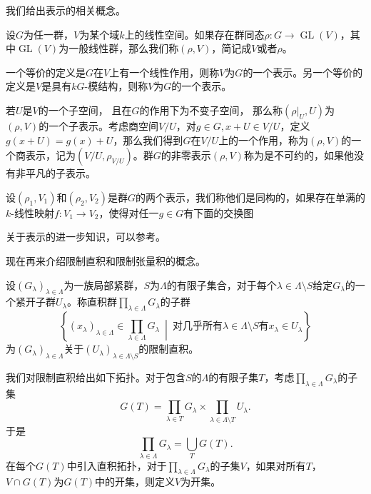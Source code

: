 我们给出表示的相关概念。

\begin{definition}
设$G$为任一群，$V$为某个域$k$上的线性空间。如果存在群同态$\rho: G \rightarrow \operatorname{GL}(V)$，其中$\operatorname{GL}(V)$为一般线性群，那么我们称$(\rho, V)$，简记成$V$或者$\rho$。
\end{definition}
一个等价的定义是$G$在$V$上有一个线性作用，则称$V$为$G$的一个表示。另一个等价的定义是$V$是具有$kG$-模结构，则称$V$为$G$的一个表示。

若$U$是$V$的一个子空间， 且在$G$的作用下为不变子空间， 那么称$(\rho|_U,U)$为$(\rho, V)$的一个子表示。考虑商空间$V/U$，对$g \in G, x + U \in V/U$，定义$g(x + U) = g(x) + U$，那么我们得到$G$在$V/U$上的一个作用，称为$(\rho, V)$的一个商表示，记为$(V/U, \rho_{V/U})$。群$G$的非零表示$(\rho, V)$称为是不可约的，如果他没有非平凡的子表示。

设$(\rho_1, V_1)$和$(\rho_2, V_2)$是群$G$的两个表示，我们称他们是同构的，如果存在单满的$k$-线性映射$f: V_1 \rightarrow V_2$，使得对任一$g \in G$有下面的交换图
\begin{center}
\end{center}

关于表示的进一步知识，可以参考。

现在再来介绍限制直积\cite{nt1}和限制张量积\cite{bump1998automorphic}的概念。

\begin{definition}
设$(G_\lambda)_{\lambda\in\Lambda}$为一族局部紧群，$S$为$\Lambda$的有限子集合，对于每个$\lambda \in \Lambda \setminus S$给定$G_\lambda$的一个紧开子群$U_\lambda$。称直积群$\displaystyle \prod\limits_{\lambda\in\Lambda} G_\lambda$的子群
$$
\left\{ (x_\lambda)_{\lambda\in\Lambda} \in \prod\limits_{\lambda\in\Lambda} G_\lambda  \ \middle|\ \text{对几乎所有$\lambda \in \Lambda \setminus S$有$x_\lambda \in U_\lambda$} \right\}
$$
为$(G_\lambda)_{\lambda\in\Lambda}$关于$(U_\lambda)_{\lambda \in \Lambda \setminus S }$的限制直积。
\end{definition}

我们对限制直积给出如下拓扑。对于包含$S$的$\Lambda$的有限子集$T$，考虑$\prod\limits_{\lambda\in\Lambda} G_\lambda$的子集
$$
G(T) = \prod\limits_{\lambda\in T} G_\lambda \times \prod\limits_{\lambda\in \Lambda \setminus T} U_\lambda.
$$
于是
$$
\prod\limits_{\lambda\in\Lambda} G_\lambda = \bigcup\limits_T G(T).
$$
在每个$G(T)$中引入直积拓扑，对于$\prod\limits_{\lambda\in\Lambda} G_\lambda$的子集$V$，如果对所有$T$，$V \cap
G(T)$为$G(T)$中的开集，则定义$V$为开集。


